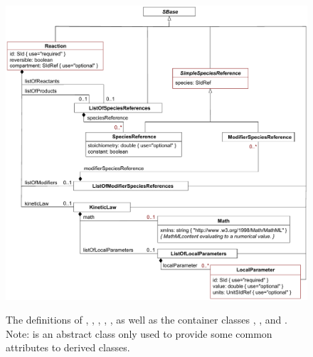 \begin{figure}[b]
  \vspace*{-2.5ex}
  \centering
             {\includegraphics[scale=0.74]{figs/reaction-uml}}
  \vspace*{-1ex}
  \caption{The definitions of \Reaction, \KineticLaw,
    \textls[-30]{\SpeciesReference}, \textls[-30]{\ModifierSpeciesReference}, \LocalParameter,
    as well as the container classes \textls[-30]{\ListOfSpeciesReferences},
    \textls[-30]{\ListOfModifierSpeciesReferences}, and \textls[-30]{\ListOfLocalParameters}.
    Note: \textls[-30]{\SimpleSpeciesReferenceUpright} is an abstract class only used
    to provide some common attributes to derived
    classes.}
  \label{fig:reaction}
\end{figure}

